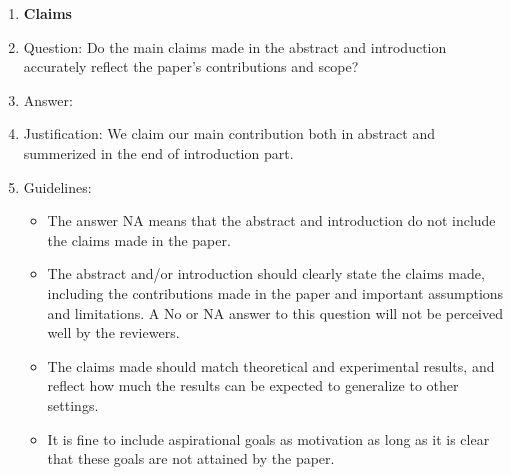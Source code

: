 \documentclass{article}
\theoremstyle{remark}
\begin{document}
\begin{enumerate}

\item {\bf Claims}
    \item[] Question: Do the main claims made in the abstract and introduction accurately reflect the paper's contributions and scope?
    \item[] Answer: \answerYes{} %
    \item[] Justification: We claim our main contribution both in abstract and summerized in the end of introduction part.
    \item[] Guidelines:
    \begin{itemize}
        \item The answer NA means that the abstract and introduction do not include the claims made in the paper.
        \item The abstract and/or introduction should clearly state the claims made, including the contributions made in the paper and important assumptions and limitations. A No or NA answer to this question will not be perceived well by the reviewers. 
        \item The claims made should match theoretical and experimental results, and reflect how much the results can be expected to generalize to other settings. 
        \item It is fine to include aspirational goals as motivation as long as it is clear that these goals are not attained by the paper. 
    \end{itemize}


\end{enumerate}
\end{document}
